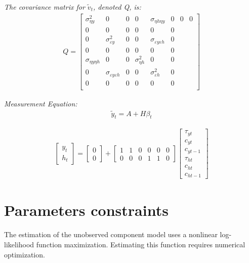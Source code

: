 \documentclass[fleqn]{article}
\begin{document}
\begin{outline}[enumerate]
\textit{The covariance matrix for $\tilde{v}_t$, denoted Q, is: }
\begin{align}
Q = 
\begin{bmatrix}
\sigma^2_{\eta y}	& 0	& 0	 &0 & \sigma_{\eta h \eta y}	& 0	& 0	& 0\\
0	& 0	& 0	& 0	& 0	& 0	\\
0	&	\sigma^2_{\varepsilon y}	& 0	& 0	& \sigma_{\varepsilon y \varepsilon h}	& 0	\\
0	& 0	& 0	& 0	& 0	& 0	\\
\sigma_{\eta y \eta h}	& 0	& 0	& \sigma^2_{\eta h}	& 0	& 0	\\
0	&	\sigma_{\varepsilon y \varepsilon h}	& 0	& 0	& \sigma^2_{\varepsilon h}	& 0	\\
0	& 0	& 0	& 0	& 0	& 0	\\
\end{bmatrix}
\end{align}

\textit{Measurement Equation:}
\begin{align}
\tilde{y}_t = A + H\beta_t
\end{align}

\begin{align*}
\begin{bmatrix}
y_t	\\
h_t
\end{bmatrix}
=
\begin{bmatrix}
0	\\
0
\end{bmatrix}
+
\begin{bmatrix}
1	& 1	& 0	& 0	& 0 & 0 \\
0	& 0 & 0 & 1 & 1 & 0
\end{bmatrix}
\begin{bmatrix}
\tau_{yt}	\\
c_{yt}		\\
c_{yt-1}	\\
\tau_{ht}	\\
c_{ht}		\\
c_{ht-1}
\end{bmatrix}
\end{align*}

\section{Parameters constraints}

The estimation of the unobserved component model uses a nonlinear log-likelihood function maximization. Estimating this function requires numerical optimization.


\end{outline}
\end{document}
